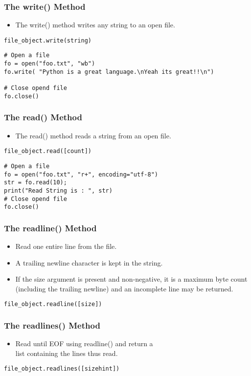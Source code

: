\documentclass{../py-lecture}
\begin{document}
\begin{frame}[fragile]
	\frametitle{The write() Method}
  \begin{itemize}
    \item The write() method writes any string to an open file.
  \end{itemize}
  \begin{verbatim}
file_object.write(string)
  \end{verbatim}
  \begin{verbatim}
# Open a file
fo = open("foo.txt", "wb")
fo.write( "Python is a great language.\nYeah its great!!\n")

# Close opend file
fo.close()
  \end{verbatim}
\end{frame}

\begin{frame}[fragile]
	\frametitle{The read() Method}
  \begin{itemize}
    \item The read() method reads a string from an open file.
  \end{itemize}
  \begin{verbatim}
file_object.read([count])
  \end{verbatim}
  \begin{verbatim}
# Open a file
fo = open("foo.txt", "r+", encoding="utf-8")
str = fo.read(10);
print("Read String is : ", str)
# Close opend file
fo.close()
	\end{verbatim}
\end{frame}

\begin{frame}[fragile]
	\frametitle{The readline() Method}
  \begin{itemize}
    \item Read one entire line from the file.
    \item A trailing newline character is kept in the string.
    \item If the size argument is present and non-negative,
    it is a maximum byte count (including the trailing newline)
    and an incomplete line may be returned.
  \end{itemize}
  \begin{verbatim}
file_object.readline([size])
  \end{verbatim}
\end{frame}

\begin{frame}[fragile]
	\frametitle{The readlines() Method}
  \begin{itemize}
    \item Read until EOF using readline() and return a \\
      list containing the lines thus read.
  \end{itemize}
  \begin{verbatim}
file_object.readlines([sizehint])
  \end{verbatim}
\end{frame}
\end{document}
